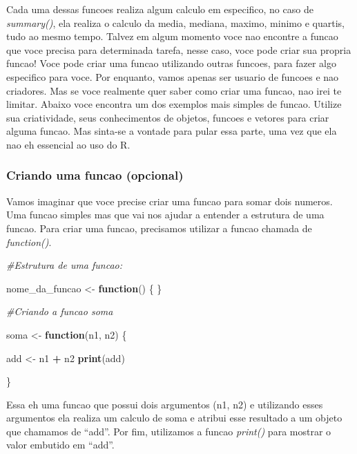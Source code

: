 \documentclass[
]{book}
\newenvironment{Shaded}{\begin{snugshade}}{\end{snugshade}}
\newcommand{\CommentTok}[1]{\textcolor[rgb]{0.56,0.35,0.01}{\textit{#1}}}
\newcommand{\ControlFlowTok}[1]{\textcolor[rgb]{0.13,0.29,0.53}{\textbf{#1}}}
\newcommand{\FunctionTok}[1]{\textcolor[rgb]{0.13,0.29,0.53}{\textbf{#1}}}
\newcommand{\NormalTok}[1]{#1}
\newcommand{\OtherTok}[1]{\textcolor[rgb]{0.56,0.35,0.01}{#1}}
\newcommand{\SpecialCharTok}[1]{\textcolor[rgb]{0.81,0.36,0.00}{\textbf{#1}}}
\begin{document}
Cada uma dessas funcoes realiza algum calculo em especifico, no caso de \emph{summary()}, ela realiza o calculo da media, mediana, maximo, minimo e quartis, tudo ao mesmo tempo. Talvez em algum momento voce nao encontre a funcao que voce precisa para determinada tarefa, nesse caso, voce pode criar sua propria funcao! Voce pode criar uma funcao utilizando outras funcoes, para fazer algo especifico para voce. Por enquanto, vamos apenas ser usuario de funcoes e nao criadores. Mas se voce realmente quer saber como criar uma funcao, nao irei te limitar. Abaixo voce encontra um dos exemplos mais simples de funcao. Utilize sua criatividade, seus conhecimentos de objetos, funcoes e vetores para criar alguma funcao. Mas sinta-se a vontade para pular essa parte, uma vez que ela nao eh essencial ao uso do R.

\hypertarget{criando-uma-funcao-opcional}{%
\subsubsection{Criando uma funcao (opcional)}\label{criando-uma-funcao-opcional}}

Vamos imaginar que voce precise criar uma funcao para somar dois numeros. Uma funcao simples mas que vai nos ajudar a entender a estrutura de uma funcao. Para criar uma funcao, precisamos utilizar a funcao chamada de \emph{function()}.

\begin{Shaded}
\begin{Highlighting}[]
\CommentTok{\#Estrutura de uma funcao:}

\NormalTok{nome\_da\_funcao }\OtherTok{\textless{}{-}} \ControlFlowTok{function}\NormalTok{() \{ \}}

\CommentTok{\#Criando a funcao soma}

\NormalTok{soma }\OtherTok{\textless{}{-}} \ControlFlowTok{function}\NormalTok{(n1, n2) \{}

\NormalTok{add }\OtherTok{\textless{}{-}}\NormalTok{ n1 }\SpecialCharTok{+}\NormalTok{ n2}
\FunctionTok{print}\NormalTok{(add)}

\NormalTok{\}}
\end{Highlighting}
\end{Shaded}

Essa eh uma funcao que possui dois argumentos (n1, n2) e utilizando esses argumentos ela realiza um calculo de soma e atribui esse resultado a um objeto que chamamos de ``add''. Por fim, utilizamos a funcao \emph{print()} para mostrar o valor embutido em ``add''.
\end{document}
